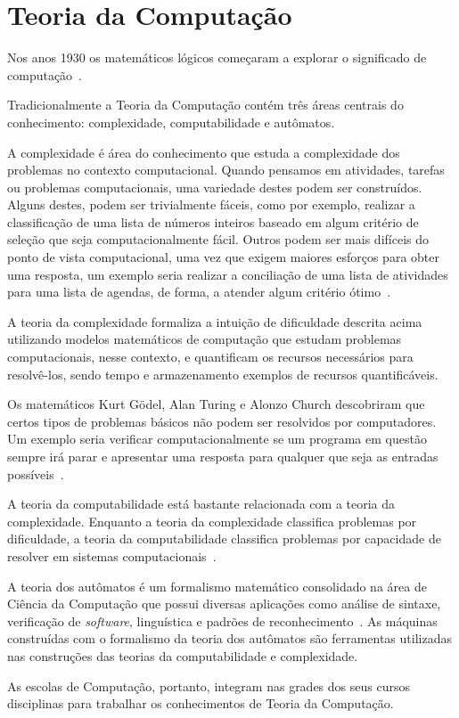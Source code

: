 \section{Teoria da Computação}
Nos anos 1930 os matemáticos lógicos começaram a explorar
o significado de computação~\cite{sipser2006introduction}.

Tradicionalmente a Teoria da Computação contém três áreas centrais
do conhecimento: complexidade, computabilidade e autômatos.

A complexidade é área do conhecimento que estuda a complexidade
dos problemas no contexto computacional.
Quando pensamos em atividades, tarefas ou problemas computacionais,
uma variedade destes podem ser construídos.
Alguns destes, podem ser trivialmente fáceis, como por exemplo,
realizar a classificação de uma lista de números inteiros baseado
em algum critério de seleção que seja computacionalmente fácil.
Outros podem ser mais difíceis do ponto de vista computacional,
uma vez que exigem maiores esforços para obter uma resposta, um exemplo seria
realizar a conciliação de uma lista de atividades para uma lista
de agendas, de forma, a atender algum critério
ótimo~\cite{sipser2006introduction}.

A teoria da complexidade formaliza a intuição de dificuldade descrita acima
utilizando modelos matemáticos de computação que estudam problemas
computacionais, nesse contexto, e quantificam os recursos necessários
para resolvê-los, sendo tempo e armazenamento exemplos de recursos
quantificáveis.

Os matemáticos Kurt G{\"o}del, Alan Turing e Alonzo Church descobriram que
certos tipos de problemas básicos não podem ser
resolvidos por computadores.
Um exemplo seria verificar computacionalmente se um programa em questão
sempre irá parar e apresentar uma resposta para qualquer que seja
as entradas possíveis~\cite{sipser2006introduction}.

A teoria da computabilidade está bastante relacionada com a teoria da complexidade.
Enquanto a teoria da complexidade classifica problemas por dificuldade, a teoria
da computabilidade classifica problemas por capacidade de resolver em sistemas
computacionais~\cite{sipser2006introduction}.

A teoria dos autômatos é um formalismo matemático consolidado na área de
Ciência da Computação que possui diversas aplicações como análise de sintaxe,
verificação de \textit{software}, linguística e padrões
de reconhecimento~\cite{pin2011elements}.
As máquinas construídas com o formalismo da teoria dos autômatos são ferramentas
utilizadas nas construções das teorias da computabilidade
e complexidade.

As escolas de Computação, portanto, integram nas grades dos seus cursos disciplinas
para trabalhar os conhecimentos de Teoria da Computação.
